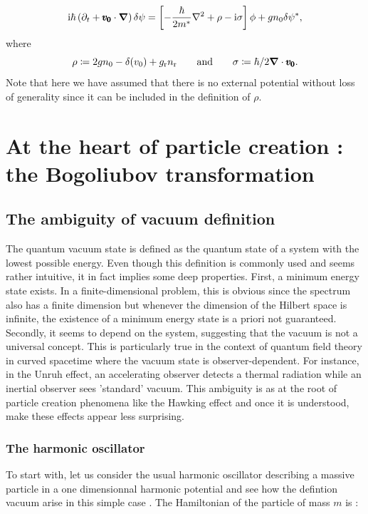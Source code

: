 \begin{equation}
    \mathrm{i} \hbar \left(\partial_t+\pmb{v_0}\cdot{\boldsymbol{\nabla}}\right)\delta\psi=\left[-\frac{\hbar}{2m^*}\nabla^2+\rho-\mathrm{i}\sigma\right]\phi+g n_0 \delta\psi^*,
        \label{eq:DefPertGPE}
\end{equation}
where $$\rho\coloneqq2g n_0- \delta(v_0)+g_{\rm r}n_{\rm r}\qquad\text{and}\qquad\sigma\coloneqq\hbar/2\boldsymbol{\nabla} \cdot\pmb{v_0}.$$
Note that here we have assumed that there is no external potential without loss of generality since it can be included in the definition of $\rho$.


\section{At the heart of particle creation : the Bogoliubov transformation}

\subsection{The ambiguity of vacuum definition}
The quantum vacuum state is defined as the quantum state of a system with the lowest possible energy. Even though 
this definition is commonly used and seems rather intuitive, it in fact implies some deep properties. First, a minimum energy state exists. In a finite-dimensional problem, this is obvious since the spectrum also has a finite dimension but whenever the dimension of the Hilbert space is infinite, the existence of a minimum energy state is a priori not guaranteed.
Secondly, it seems to depend on the system, suggesting that the vacuum is not a universal concept. This is particularly true in the context of quantum field theory in curved spacetime where the vacuum state is observer-dependent.
For instance, in the Unruh effect, an accelerating observer detects a thermal radiation while an inertial observer sees 'standard' vacuum. This ambiguity is
as at the root of particle creation phenomena like the Hawking effect and once it is understood, make these effects appear less surprising.


\subsubsection{The harmonic oscillator}

To start with, let us consider the usual harmonic oscillator describing a massive particle in a one dimensionnal harmonic potential and
see how the defintion vacuum arise in this simple case \cite{CCT_tome1}. The Hamiltonian of the particle of mass $m$ is :


